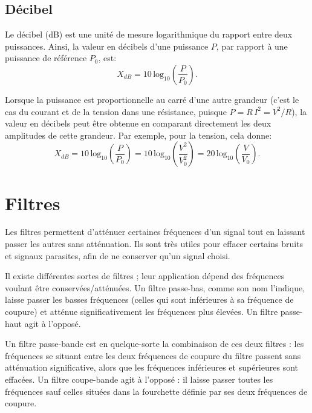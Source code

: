 \documentclass[canadien,12pt,oneside,letterpaper]{article}
\begin{document}
\subsection{Décibel}

Le décibel (dB) est une unité de mesure logarithmique du rapport entre deux puissances. Ainsi, la valeur en décibels d'une puissance $P$, par rapport à une puissance de référence $P_0$, est:
\begin{equation}
X_{dB}=10 \, \mathrm{log}_{10}\left( \frac{P}{P_0} \right).
\end{equation}

Lorsque la puissance est proportionnelle au carré d'une autre grandeur (c'est le cas du courant et de la tension dans une résistance, puisque $P=R\,I^2=V^2/R$), la valeur en décibels peut être obtenue en comparant directement les deux amplitudes de cette grandeur. Par exemple, pour la tension, cela donne:
\begin{equation}
X_{dB}=10 \, \mathrm{log}_{10}\left( \frac{P}{P_0} \right)=10 \, \mathrm{log}_{10}\left( \frac{V^2}{V_0^2} \right)=20 \, \mathrm{log}_{10}\left( \frac{V}{V_0} \right).
\end{equation}


\section{Filtres}

Les filtres permettent d'atténuer certaines fréquences d'un signal tout en laissant passer les autres sans atténuation. Ils sont très utiles pour effacer certains bruits et signaux parasites, afin de ne conserver qu'un signal choisi.

Il existe différentes sortes de filtres ; leur application dépend des fréquences voulant être conservées/atténuées. Un filtre passe-bas, comme son nom l'indique, laisse passer les basses fréquences (celles qui sont inférieures à sa fréquence de coupure) et atténue significativement les fréquences plus élevées. Un filtre passe-haut agit à l'opposé.

Un filtre passe-bande est en quelque-sorte la combinaison de ces deux filtres : les fréquences se situant entre les deux fréquences de coupure du filtre passent sans atténuation significative, alors que les fréquences inférieures et supérieures sont effacées. Un filtre coupe-bande agit à l'opposé : il laisse passer toutes les fréquences sauf celles situées dans la fourchette définie par ses deux fréquences de coupure.
\end{document}
